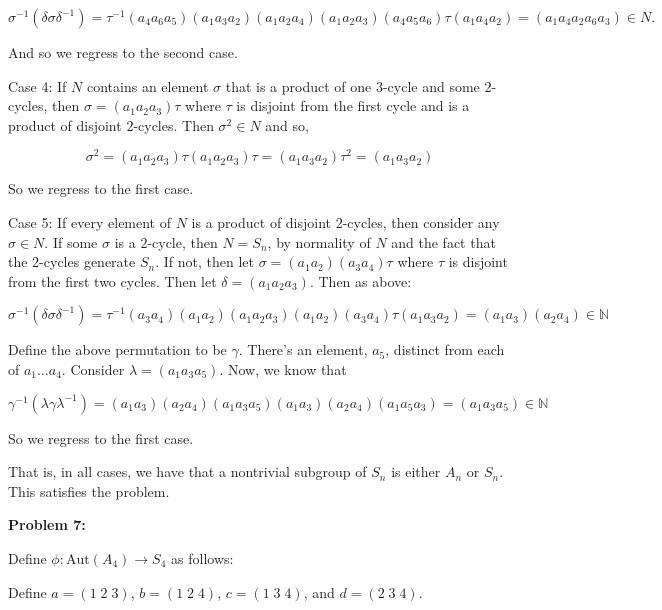 \documentclass[a4paper,12pt]{article}
\newcommand{\tab}{\hspace{4mm}} %
\newcommand{\shunt}{\vspace{20mm}}
\newcommand{\ga}{\gamma}
\newcommand{\de}{\delta}
\newcommand{\la}{\lambda}
\newcommand{\si}{\sigma}
\newcommand{\N}{\mathbb{N}}
\begin{document}
\begin{displaymath}
\sigma^{-1}(\de \sigma \de^{-1}) = \tau^{-1}(a_4a_6a_5)(a_1a_3a_2)(a_1a_2a_4)(a_1a_2a_3)(a_4a_5a_6)\tau (a_1a_4a_2) = (a_1a_4a_2a_6a_3) \in N.
\end{displaymath}

\tab And so we regress to the second case.

\tab Case 4: If $N$ contains an element $\sigma$ that is a product of one $3$-cycle and some $2$-cycles, then $\sigma = (a_1a_2a_3)\tau$ where $\tau$ is disjoint from the first cycle and is a product of disjoint $2$-cycles. Then $\sigma ^2 \in N$ and so,

\begin{displaymath}
\si^2 =  (a_1a_2a_3)\tau(a_1a_2a_3)\tau = (a_1a_3a_2)\tau^2 = (a_1a_3a_2)
\end{displaymath}

\tab So we regress to the first case.

\tab Case 5: If every element of $N$ is a product of disjoint $2$-cycles, then consider any $\si \in N$. If some $\si$ is a $2$-cycle, then $N = S_n$, by normality of $N$ and the fact that the $2$-cycles generate $S_n$. If not, then let $\si = (a_1a_2)(a_3a_4)\tau$ where $\tau$ is disjoint from the first two cycles. Then let $\de = (a_1a_2a_3)$. Then as above:

\begin{displaymath}
\sigma^{-1}(\de \sigma \de^{-1}) = \tau^{-1}(a_3a_4)(a_1a_2)(a_1a_2a_3)(a_1a_2)(a_3a_4)\tau(a_1a_3a_2)=(a_1a_3)(a_2a_4) \in \N
\end{displaymath}

\tab Define the above permutation to be $\ga$. There's an element, $a_5$, distinct from each of $a_1 \ldots a_4$. Consider $\la = (a_1a_3a_5)$. Now, we know that 

\begin{displaymath}
\ga^{-1}(\la \ga \la^{-1}) = (a_1a_3)(a_2a_4)(a_1a_3a_5)(a_1a_3)(a_2a_4)(a_1a_5a_3) = (a_1a_3a_5) \in \N
\end{displaymath}

\tab So we regress to the first case.

That is, in all cases, we have that a nontrivial subgroup of $S_n$ is either $A_n$ or $S_n$. This satisfies the problem.

\shunt

{\bf Problem 7:}

Define $\phi: \text{Aut}(A_4) \to S_4$ as follows:

\tab Define $a = (1 \; 2 \; 3)$, $b= (1 \; 2 \; 4)$, $c = (1 \; 3 \; 4)$, and $d = (2 \; 3 \; 4)$.
\end{document}
